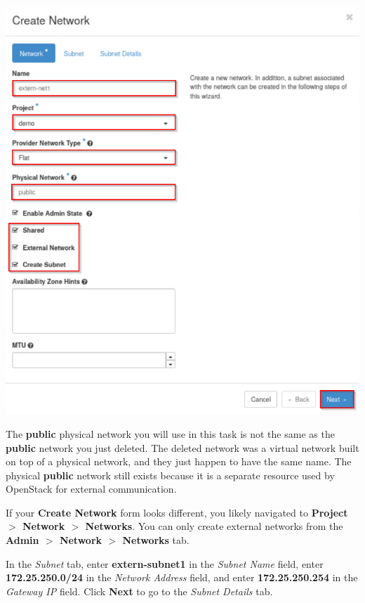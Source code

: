 \documentclass[letterpaper, 12pt]{article}
\begin{document}
\begin{enumerate}
\begin{labstep}
        \begin{center}
            \includegraphics[width=\linewidth]{images/part1/step7.png}
        \end{center}
    \end{labstep}

    \begin{notebox}
        The \textbf{public} physical network you will use in this task is not the same as the \textbf{public} network you just deleted.
        The deleted network was a virtual network built on top of a physical network, and they just happen to have the same name.
        The physical \textbf{public} network still exists because it is a separate resource used by OpenStack for external communication.
    \end{notebox}
    \begin{tipbox}
        If your \textbf{Create Network} form looks different, you likely navigated to \textbf{Project $>$ Network $>$ Networks}.
        You can only create external networks from the \textbf{Admin $>$ Network $>$ Networks} tab.
    \end{tipbox}

    \begin{labstep}
        In the \textit{Subnet} tab, enter \textbf{extern-subnet1} in the \textit{Subnet Name} field, enter \textbf{172.25.250.0/24} in the \textit{Network Address} field, and enter \textbf{172.25.250.254} in the \textit{Gateway IP} field.
        Click \textbf{Next} to go to the \textit{Subnet Details} tab.


\end{labstep}
\end{enumerate}
\end{document}
